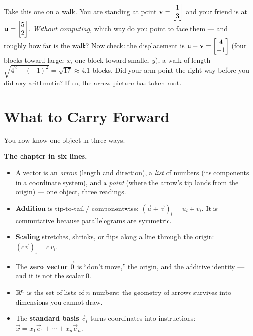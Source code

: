 \begin{walkbox}
Take this one on a walk. You are standing at point $\mathbf{v}=\begin{bmatrix}1\\3\end{bmatrix}$ and your friend
is at $\mathbf{u}=\begin{bmatrix}5\\2\end{bmatrix}$. \emph{Without computing}, which way do you point to face
them --- and roughly how far is the walk? Now check: the displacement is
$\mathbf{u}-\mathbf{v}=\begin{bmatrix}4\\-1\end{bmatrix}$ (four blocks toward larger $x$, one block toward smaller
$y$), a walk of length $\sqrt{4^2+(-1)^2}=\sqrt{17}\approx 4.1$ blocks. Did your arm point
the right way before you did any arithmetic? If so, the arrow picture has taken root.
\end{walkbox}

\section{What to Carry Forward}
\label{ch02:summary}

You now know one object in three ways.

\begin{focusbox}
\textbf{The chapter in six lines.}
\begin{itemize}
  \item A vector is an \emph{arrow} (length and direction), a \emph{list} of numbers
        (its components in a coordinate system), and a \emph{point} (where the arrow's tip
        lands from the origin) --- one object, three readings.
  \item \textbf{Addition} is tip-to-tail / componentwise: $(\vec{u}+\vec{v})_i = u_i+v_i$.
        It is commutative because parallelograms are symmetric.
  \item \textbf{Scaling} stretches, shrinks, or flips along a line through the origin:
        $(c\vec{v})_i = c\,v_i$.
  \item The \textbf{zero vector} $\vec{0}$ is ``don't move,'' the origin, and the additive
        identity --- and it is not the scalar $0$.
  \item $\mathbb{R}^n$ is the set of lists of $n$ numbers; the geometry of arrows survives into
        dimensions you cannot draw.
  \item The \textbf{standard basis} $\vec{e}_i$ turns coordinates into instructions:
        $\vec{x} = x_1\vec{e}_1 + \cdots + x_n\vec{e}_n$.
\end{itemize}
\end{focusbox}


